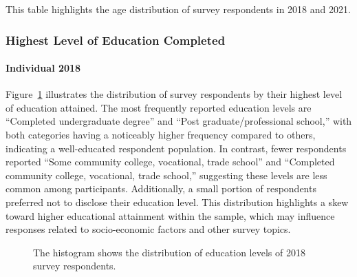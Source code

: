 \documentclass[
  letterpaper,
  DIV=11,
  numbers=noendperiod]{scrartcl}
\let\oldparagraph\paragraph
\renewcommand{\paragraph}[1]{\oldparagraph{#1}\mbox{}}
\begin{document}
This table highlights the age distribution of survey respondents in 2018
and 2021.

\subsubsection{Highest Level of Education
Completed}\label{highest-level-of-education-completed}

\paragraph{Individual 2018}\label{individual-2018-1}

Figure~\ref{fig-two} illustrates the distribution of survey respondents
by their highest level of education attained. The most frequently
reported education levels are ``Completed undergraduate degree'' and
``Post graduate/professional school,'' with both categories having a
noticeably higher frequency compared to others, indicating a
well-educated respondent population. In contrast, fewer respondents
reported ``Some community college, vocational, trade school'' and
``Completed community college, vocational, trade school,'' suggesting
these levels are less common among participants. Additionally, a small
portion of respondents preferred not to disclose their education level.
This distribution highlights a skew toward higher educational attainment
within the sample, which may influence responses related to
socio-economic factors and other survey topics.

\begin{figure}


\caption{\label{fig-two}The histogram shows the distribution of
education levels of 2018 survey respondents.}

\end{figure}%
\end{document}
